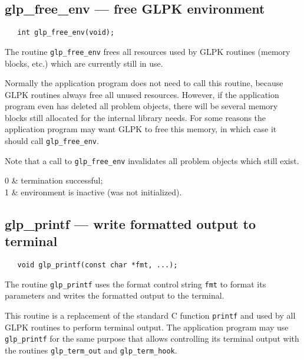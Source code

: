 \newpage

\subsection{glp\_free\_env --- free GLPK environment}

\synopsis

\begin{verbatim}
   int glp_free_env(void);
\end{verbatim}

\description

The routine \verb|glp_free_env| frees all resources used by GLPK
routines (memory blocks, etc.) which are currently still in use.

Normally the application program does not need to call this routine,
because GLPK routines always free all unused resources. However, if
the application program even has deleted all problem objects, there
will be several memory blocks still allocated for the internal library
needs. For some reasons the application program may want GLPK to free
this memory, in which case it should call \verb|glp_free_env|.

Note that a call to \verb|glp_free_env| invalidates all problem objects
which still exist.

\returns

\begin{retlist}
0 & termination successful;\\
1 & environment is inactive (was not initialized).\\
\end{retlist}

\subsection{glp\_printf --- write formatted output to terminal}

\synopsis

\begin{verbatim}
   void glp_printf(const char *fmt, ...);
\end{verbatim}

\description

The routine \verb|glp_printf| uses the format control string
\verb|fmt| to format its parameters and writes the formatted output to
the terminal.

This routine is a replacement of the standard C function
\verb|printf| and used by all GLPK routines to perform terminal
output. The application program may use \verb|glp_printf| for the same
purpose that allows controlling its terminal output with the routines
\verb|glp_term_out| and \verb|glp_term_hook|.

